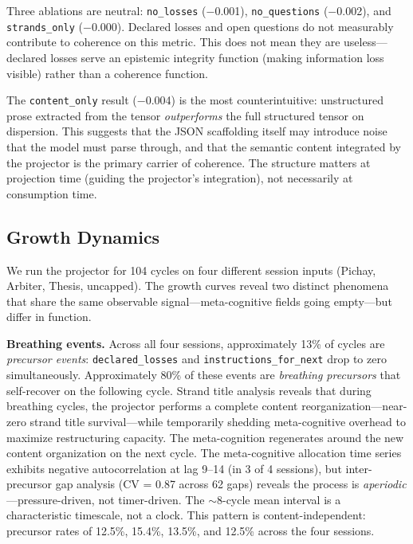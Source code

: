 \documentclass[11pt]{article}
\begin{document}
Three ablations are neutral: \texttt{no\_losses} ($-$0.001),
\texttt{no\_questions} ($-$0.002), and \texttt{strands\_only}
($-$0.000). Declared losses and open questions do not measurably
contribute to coherence on this metric. This does not mean they are
useless---declared losses serve an epistemic integrity function (making
information loss visible) rather than a coherence function.

The \texttt{content\_only} result ($-$0.004) is the most
counterintuitive: unstructured prose extracted from the tensor
\emph{outperforms} the full structured tensor on dispersion. This
suggests that the JSON scaffolding itself may introduce noise that the
model must parse through, and that the semantic content integrated by
the projector is the primary carrier of coherence. The structure
matters at projection time (guiding the projector's integration), not
necessarily at consumption time.

\subsection{Growth Dynamics}
\label{sec:growth}

We run the projector for 104 cycles on four different session inputs
(Pichay, Arbiter, Thesis, uncapped). The growth curves reveal two
distinct phenomena that share the same observable signal---meta-cognitive
fields going empty---but differ in function.

\textbf{Breathing events.} Across all four sessions, approximately 13\%
of cycles are \emph{precursor events}: \texttt{declared\_losses} and
\texttt{instructions\_for\_next} drop to zero simultaneously.
Approximately 80\% of these events are \emph{breathing precursors} that
self-recover on the following cycle. Strand title analysis reveals that
during breathing cycles, the projector performs a complete content
reorganization---near-zero strand title survival---while temporarily
shedding meta-cognitive overhead to maximize restructuring capacity.
The meta-cognition regenerates around the new content organization on
the next cycle. The meta-cognitive allocation time series exhibits negative
autocorrelation at lag 9--14 (in 3 of 4 sessions), but inter-precursor
gap analysis (CV = 0.87 across 62 gaps) reveals the process is
\emph{aperiodic}---pressure-driven, not timer-driven. The $\sim$8-cycle
mean interval is a characteristic timescale, not a clock.
This pattern is content-independent: precursor rates of 12.5\%, 15.4\%,
13.5\%, and 12.5\% across the four sessions.
\end{document}
